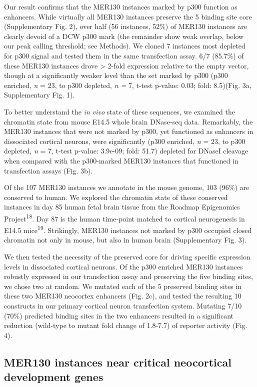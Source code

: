 \documentclass[]{article}
\begin{document}
Our result confirms that the MER130 instances marked by p300 function as
enhancers. While virtually all MER130 instances preserve the 5 binding
site core (Supplementary Fig. 2), over half (56 instances, 52\%) of
MER130 instances are clearly devoid of a DCW p300 mark (the remainder
show weak overlap, below our peak calling threshold; see Methods). We
cloned 7 instances most depleted for p300 signal and tested them in the
same transfection assay. 6/7 (85.7\%) of these MER130 instances drove
\textgreater{} 2-fold expression relative to the empty vector, though at
a significantly weaker level than the set marked by p300 (p300 enriched,
\emph{n} = 23, to p300 depleted, \emph{n =} 7, t-test p-value: 0.03;
fold: 8.5)(Fig. 3a, Supplementary Fig. 1).

To better understand the \emph{in vivo} state of these sequences, we
examined the chromatin state from mouse E14.5 whole brain DNase-seq
data. Remarkably, the MER130 instances that were not marked by p300, yet
functioned as enhancers in dissociated cortical neurons, were
significantly (p300 enriched, \emph{n} = 23, to p300 depleted, \emph{n}
= 7, t-test p-value: 3.9e-09; fold: 51.7) depleted for DNaseI cleavage
when compared with the p300-marked MER130 instances that functioned in
transfection assays (Fig. 3b).

Of the 107 MER130 instances we annotate in the mouse genome, 103 (96\%)
are conserved to human. We explored the chromatin state of these
conserved instances in day 85 human fetal brain tissue from the Roadmap
Epigenomics Project\textsuperscript{18}. Day 87 is the human time-point
matched to cortical neurogenesis in E14.5 mice\textsuperscript{19}.
Strikingly, MER130 instances not marked by p300 occupied closed
chromatin not only in mouse, but also in human brain (Supplementary Fig.
3).

We then tested the necessity of the preserved core for driving specific
expression levels in dissociated cortical neurons. Of the p300 enriched
MER130 instances robustly expressed in our transfection assay and
preserving the five binding sites, we chose two at random. We mutated
each of the 5 preserved binding sites in these two MER130 neocortex
enhancers (Fig. 2c), and tested the resulting 10 constructs in our
primary cortical neuron transfection system. Mutating 7/10 (70\%)
predicted binding sites in the two enhancers resulted in a significant
reduction (wild-type to mutant fold change of 1.8-7.7) of reporter
activity (Fig. 4).

\subsection{MER130 instances near critical neocortical development
genes}\label{mer130-instances-near-critical-neocortical-development-genes}
\end{document}
